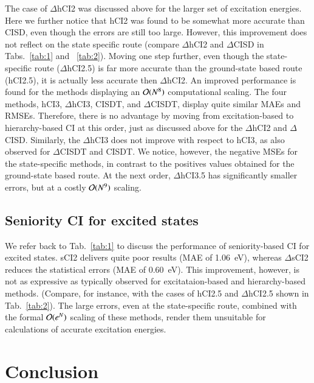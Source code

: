 \documentclass[aip,jcp,reprint,noshowkeys,superscriptaddress]{revtex4-1}
\begin{document}
The case of $\Delta$hCI2 was discussed above for the larger set of excitation energies.
Here we further notice that hCI2 was found to be somewhat more accurate than CISD, even though the errors are still too large.
However, this improvement does not reflect on the state specific route (compare $\Delta$hCI2 and $\Delta$CISD in Tabs.~\ref{tab:1} and ~\ref{tab:2}).
Moving one step further, even though the state-specific route ($\Delta$hCI2.5) is far more accurate than the ground-state based route (hCI2.5),
it is actually less accurate then $\Delta$hCI2.
An improved performance is found for the methods displaying an $\order*{N^8}$ computational scaling.
The four methods, hCI3, $\Delta$hCI3, CISDT, and $\Delta$CISDT, display quite similar MAEs and RMSEs.
Therefore, there is no advantage by moving from excitation-based to hierarchy-based CI at this order, just as discussed above for the $\Delta$hCI2 and $\Delta$CISD.
Similarly, the $\Delta$hCI3 does not improve with respect to hCI3, as also observed for $\Delta$CISDT and CISDT. \cite{Kossoski_2023}
We notice, however, the negative MSEs for the state-specific methods, in contrast to the positives values obtained for the ground-state based route.
At the next order, $\Delta$hCI3.5 has significantly smaller errors, but at a costly $\order*{N^9}$ scaling.



\subsection{Seniority CI for excited states}
\label{sec:res_C}

We refer back to Tab.~\ref{tab:1} to discuss the performance of seniority-based CI for excited states.
sCI2 delivers quite poor results (MAE of \SI{1.06}{eV}), whereas $\Delta$sCI2 reduces the statistical errors (MAE of \SI{0.60}{eV}).
This improvement, however, is not as expressive as typically observed for excitataion-based and hierarchy-based methods.
(Compare, for instance, with the cases of hCI2.5 and $\Delta$hCI2.5 shown in Tab.~\ref{tab:2}).
The large errors, even at the state-specific route, combined with the formal $\order*{e^N}$ scaling of these methods,
render them unsuitable for calculations of accurate excitation energies.


\section{Conclusion}
\label{sec:ccl}
\end{document}
